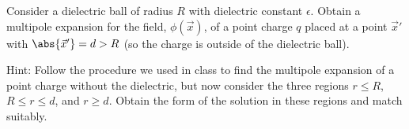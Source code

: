 \newcommand{\eps}{\epsilon}
\newcommand{\vx}{\vec{x}}
\newcommand{\phix}{\phi(\vx)}
\newcommand{\vp}{\vec{p}}
\newcommand{\dcx}{\dd[3]{x}}
\newcommand{\dcxp}{\dd[3]{x'}}
\newcommand{\rhox}{\rho(\vx)}
\newcommand{\rhoxp}{\rho(\vx')}
\newcommand{\xh}{\vec{\hat{x}}}
\newcommand{\absx}{\abs{\vx}}
\newcommand{\absxp}{\abs{\vx'}}

\newcommand{\Ylm}{Y_{l m}}
\newcommand{\qlm}{q_{l m}}
\newcommand{\Plm}{P_l^m}
\newcommand{\tht}{\theta}
\newcommand{\cost}{\cos\tht}
\newcommand{\vph}{\varphi}
\newcommand{\tv}{(\tht, \vph)}
\newcommand{\tvp}{(\tht', \vph')}
\newcommand{\Gxxp}{G(\vx, \vx')}
\newcommand{\qplm}{q'_{l m}}

\newcommand{\lap}{\nabla^2}
\newcommand{\evphi}{\ev{\phi}}
\newcommand{\evphix}{\evphi\!(\vx)}
\newcommand{\rhof}{\rho_f}
\newcommand{\fe}{\frac{1}{\eps}}
\newcommand{\tif}{\text{if }}
\newcommand{\Al}{A_l}
\newcommand{\Bl}{B_l}
\newcommand{\Cl}{C_l}

\newcommand{\intoi}{\int_0^\infty}
\newcommand{\intono}{\int_{-1}^{1}}
\newcommand{\intotp}{\int_0^{2\pi}}
\newcommand{\drp}{\dd{r'}}
\newcommand{\dctp}{\dd{(\cost')}}
\newcommand{\dvp}{\dd{\vph'}}

\newcommand{\Ploq}{P_l^0(1)}
\newcommand{\Ylotv}{Y_{l 0}\tv}
\newcommand{\dr}{\dd{r}}
\newcommand{\dct}{\dd{(\cost)}}
\newcommand{\ddv}{\dd{\vph}}

\begin{statement}{}
	Consider a dielectric ball of radius $R$ with dielectric constant $\eps$.  Obtain a multipole expansion for the field, $\phix$, of a point charge $q$ placed at a point $\vx'$ with $\abs{\vx'} = d > R$ (so the charge is outside of the dielectric ball).
	
	Hint: Follow the procedure we used in class to find the multipole expansion of a point charge without the dielectric, but now consider the three regions $r \leq R$, $R \leq r \leq d$, and $r \geq d$.  Obtain the form of the solution in these regions and match suitably.
\end{statement}

